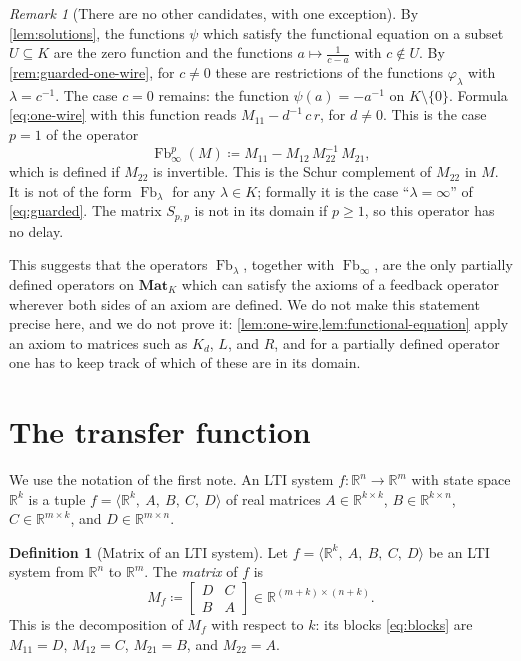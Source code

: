 \documentclass[11pt,a4paper]{article}
\theoremstyle{plain}
\theoremstyle{definition}
\newtheorem{definition}[theorem]{Definition}
\theoremstyle{remark}
\newtheorem{remark}[theorem]{Remark}
\DeclareMathOperator{\Fb}{Fb}
\newcommand{\R}{\mathbb{R}}
\newcommand{\Mat}{\mathbf{Mat}}
\newcommand{\sys}[5]{\bigl\langle #1,\ #2,\ #3,\ #4,\ #5 \bigr\rangle}
\begin{document}
\begin{remark}[There are no other candidates, with one exception]
    \label{rem:classification}
    By \cref{lem:solutions}, the functions $\psi$ which satisfy the functional equation on a subset $U \subseteq K$ are the zero function and the functions $a \mapsto \frac{1}{c - a}$ with $c \notin U$.
    By \cref{rem:guarded-one-wire}, for $c \neq 0$ these are restrictions of the functions $\varphi_\lambda$ with $\lambda = c^{-1}$.
    The case $c = 0$ remains: the function $\psi(a) = -a^{-1}$ on $K \setminus \{0\}$.
    Formula \cref{eq:one-wire} with this function reads $M_{11} - d^{-1}\, c\, r$, for $d \neq 0$.
    This is the case $p = 1$ of the operator
    \begin{equation}
        \label{eq:schur}
        \Fb^p_\infty(M) \coloneqq M_{11} - M_{12}\, M_{22}^{-1}\, M_{21},
    \end{equation}
    which is defined if $M_{22}$ is invertible.
    This is the Schur complement of $M_{22}$ in $M$.
    It is not of the form $\Fb_\lambda$ for any $\lambda \in K$; formally it is the case ``$\lambda = \infty$'' of \cref{eq:guarded}.
    The matrix $S_{p,p}$ is not in its domain if $p \geq 1$, so this operator has no delay.

    This suggests that the operators $\Fb_\lambda$, together with $\Fb_\infty$, are the only partially defined operators on $\Mat_K$ which can satisfy the axioms of a feedback operator wherever both sides of an axiom are defined.
    We do not make this statement precise here, and we do not prove it: \cref{lem:one-wire,lem:functional-equation} apply an axiom to matrices such as $K_d$, $L$, and $R$, and for a partially defined operator one has to keep track of which of these are in its domain.
\end{remark}

\section{The transfer function}
\label{sec:transfer}

We use the notation of the first note.
An LTI system $f \colon \R^n \to \R^m$ with state space $\R^k$ is a tuple $f = \sys{\R^k}{A}{B}{C}{D}$ of real matrices $A \in \R^{k \times k}$, $B \in \R^{k \times n}$, $C \in \R^{m \times k}$, and $D \in \R^{m \times n}$.

\begin{definition}[Matrix of an LTI system]
    \label{def:static-matrix}
Let $f = \sys{\R^k}{A}{B}{C}{D}$ be an LTI system from $\R^n$ to $\R^m$.
    The \emph{matrix} of $f$ is
    \begin{equation}
        \label{eq:static-matrix}
        M_f \coloneqq \begin{bmatrix} D & C \\ B & A \end{bmatrix} \in \R^{(m+k) \times (n+k)} .
    \end{equation}
    This is the decomposition of $M_f$ with respect to $k$: its blocks \cref{eq:blocks} are $M_{11} = D$, $M_{12} = C$, $M_{21} = B$, and $M_{22} = A$.
\end{definition}
\end{document}

